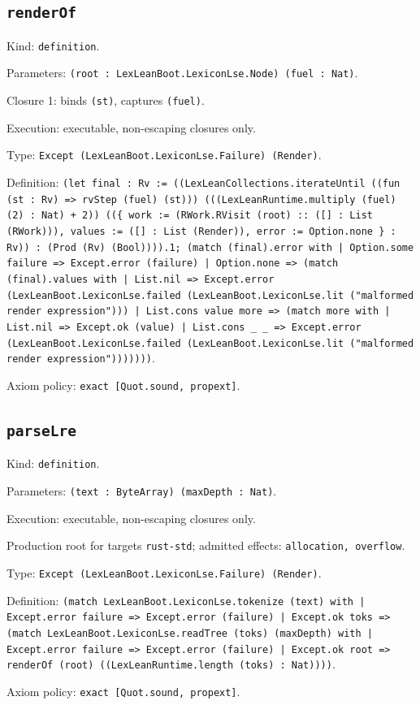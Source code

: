 \documentclass[11pt]{article}
\begin{document}
\subsection*{\texttt{renderOf}}
\noindent Kind: \texttt{definition}.\par
\noindent Parameters: \texttt{(root : LexLeanBoot.LexiconLse.Node) (fuel : Nat)}.\par
\noindent Closure 1: binds \texttt{(st)}, captures \texttt{(fuel)}.\par
\noindent Execution: executable, non-escaping closures only.\par
\noindent Type: \texttt{Except (LexLeanBoot.LexiconLse.Failure) (Render)}.\par
\noindent Definition: \texttt{(let final : Rv := ((LexLeanCollections.iterateUntil ((fun (st : Rv) => rvStep (fuel) (st))) (((LexLeanRuntime.multiply (fuel) (2) : Nat) + 2)) ((\{ work := (RWork.RVisit (root) :: ([] : List (RWork))), values := ([] : List (Render)), error := Option.none \} : Rv)) : (Prod (Rv) (Bool)))).1; (match (final).error with | Option.some failure => Except.error (failure) | Option.none => (match (final).values with | List.nil => Except.error (LexLeanBoot.LexiconLse.failed (LexLeanBoot.LexiconLse.lit ("malformed render expression"))) | List.cons value more => (match more with | List.nil => Except.ok (value) | List.cons \_ \_ => Except.error (LexLeanBoot.LexiconLse.failed (LexLeanBoot.LexiconLse.lit ("malformed render expression")))))))}.\par
\noindent Axiom policy: \texttt{exact [Quot.sound, propext]}.\par
\subsection*{\texttt{parseLre}}
\noindent Kind: \texttt{definition}.\par
\noindent Parameters: \texttt{(text : ByteArray) (maxDepth : Nat)}.\par
\noindent Execution: executable, non-escaping closures only.\par
\noindent Production root for targets \texttt{rust-std}; admitted effects: \texttt{allocation, overflow}.\par
\noindent Type: \texttt{Except (LexLeanBoot.LexiconLse.Failure) (Render)}.\par
\noindent Definition: \texttt{(match LexLeanBoot.LexiconLse.tokenize (text) with | Except.error failure => Except.error (failure) | Except.ok toks => (match LexLeanBoot.LexiconLse.readTree (toks) (maxDepth) with | Except.error failure => Except.error (failure) | Except.ok root => renderOf (root) ((LexLeanRuntime.length (toks) : Nat))))}.\par
\noindent Axiom policy: \texttt{exact [Quot.sound, propext]}.\par
\end{document}
